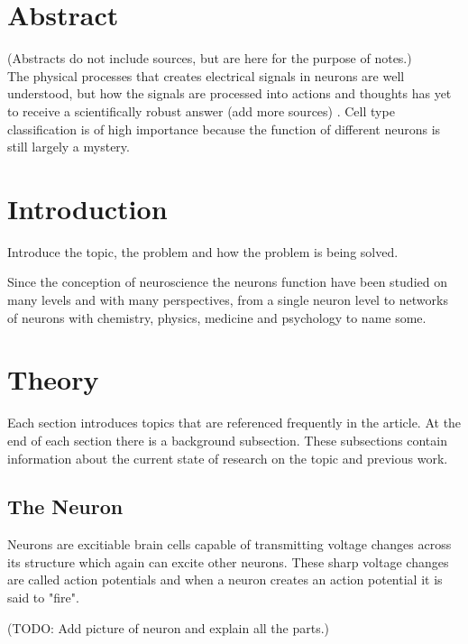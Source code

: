 \documentclass[altfont]{uiophd}
\renewcommand{\cite}[1]{\mycite{#1}}
\begin{document}
\chapter*{Abstract}
(Abstracts do not include sources, but are here for the purpose of notes.) \\

\noindent
The physical processes that creates electrical signals in neurons are well understood, 
but how the signals are processed into actions and thoughts has yet to 
receive a scientifically robust answer
(add more sources) 
\cite{sterratt2011principles}. 
Cell type classification is of high importance because the function of different 
neurons is still largely a mystery. 

\setcounter{tocdepth}{1}
\startcontents
\tableofcontents

\chapter{Introduction}
Introduce the topic, the problem and how the problem is being solved. 

Since 
the conception of neuroscience the neurons function have been studied on many levels
and with many perspectives, 
from a single neuron level to networks of neurons with chemistry, physics, medicine
and psychology to name some. 


\chapter{Theory}
Each section introduces topics that are referenced frequently in the article. 
At the end of each section there is a background subsection. 
These subsections contain information
about the current state of research on the topic and previous work. 

\vspace{1em} 
\startcontents
{}
  
\section{The Neuron}
Neurons are excitiable brain cells capable of transmitting voltage changes across its 
structure which again can excite other neurons. These sharp voltage changes are called 
action potentials and when a neuron creates an action potential it is said to "fire".

(TODO: Add picture of neuron and explain all the parts.)
\end{document}
